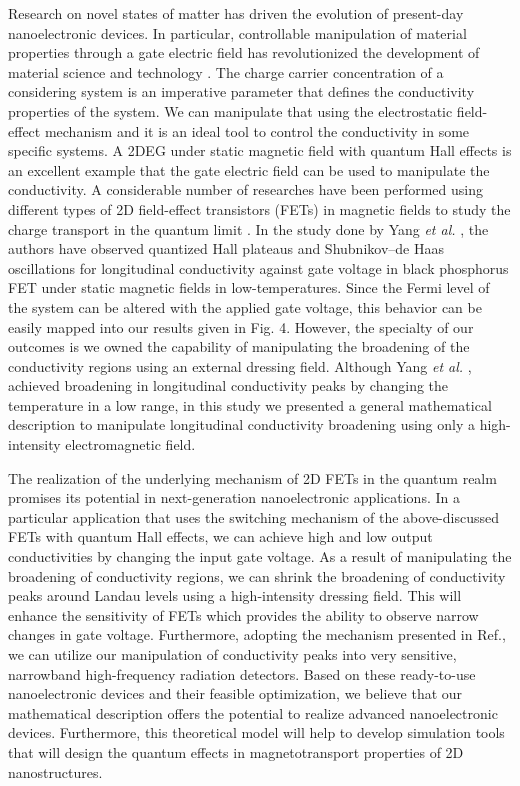 \documentclass[
 reprint,
 amsmath,amssymb,
 aps,
 prb,
]{revtex4-2}
\begin{document}
{Research on novel states of matter has driven the evolution of present-day nanoelectronic devices. In particular, controllable manipulation of material properties through a gate electric field has revolutionized the development of material science and technology \cite{ahn03,deng18}.
The charge carrier concentration of a considering system is an imperative parameter that defines the conductivity properties of the system. We can manipulate that using the electrostatic field-effect mechanism and it is an ideal tool to control the conductivity in some specific systems.
A 2DEG under static magnetic field with quantum Hall effects is an excellent example that the gate electric field can be used to manipulate the conductivity. A considerable number of researches have been performed using different types of 2D field-effect transistors (FETs) in magnetic fields to study the charge transport in the quantum limit \cite{wakabayashi78,yang18,long20,li14}. In the study done by Yang \textit{et al.} \cite{yang18}, the authors have observed quantized Hall plateaus and Shubnikov–de Haas oscillations for longitudinal conductivity against gate voltage in black phosphorus FET under static magnetic fields in low-temperatures. Since the Fermi level of the system can be altered with the applied gate voltage, this behavior can be easily mapped into our results given in Fig. 4. However, the specialty of our outcomes is we owned the capability of manipulating the broadening of the conductivity regions using an external dressing field. Although Yang \textit{et al.} \cite{yang18}, achieved broadening in longitudinal conductivity peaks by changing the temperature in a low range, in this study we presented a general mathematical description to manipulate longitudinal conductivity broadening using only a high-intensity electromagnetic field.

The realization of the underlying mechanism of 2D FETs in the quantum realm promises its potential in next-generation nanoelectronic applications. In a particular application that uses the switching mechanism of the above-discussed FETs with quantum Hall effects, we can achieve high and low output conductivities by changing the input gate voltage. As a result of manipulating the broadening of conductivity regions, we can shrink the broadening of conductivity peaks around Landau levels using a high-intensity dressing field. This will enhance the sensitivity of FETs which provides the ability to observe narrow changes in gate voltage.
Furthermore, adopting the mechanism presented in Ref.\cite{hirakawa01}, we can utilize our manipulation of conductivity peaks into very sensitive, narrowband high-frequency radiation detectors.
Based on these ready-to-use nanoelectronic devices and their feasible optimization, we believe that our mathematical description offers the potential to realize advanced nanoelectronic devices. Furthermore, this theoretical model will help to develop simulation tools that will design the quantum effects in magnetotransport properties of 2D nanostructures.
}
\end{document}

